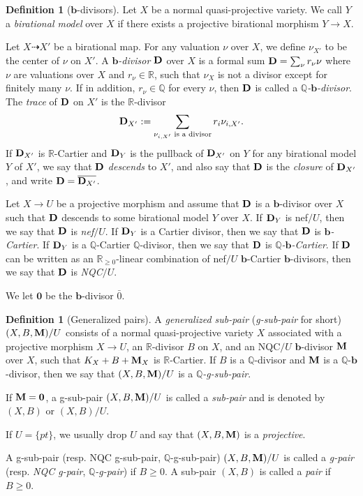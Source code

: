 \documentclass[11pt]{amsart}
\numberwithin{equation}{section}
\newcommand{\bb}{\bm{b}}
\newcommand{\Mm}{{\bf{M}}}
\newcommand{\Dd}{{\bf{D}}}
\newcommand{\Qq}{\mathbb{Q}}
\newcommand{\Rr}{\mathbb{R}}
\theoremstyle{definition}
\newtheorem{defn}[thm]{Definition}
\theoremstyle{definition}
\theoremstyle{definition}
\begin{document}
\begin{defn}[$\bb$-divisors]\label{defn: b divisors} Let $X$ be a normal quasi-projective variety. We call $Y$ a \emph{birational model} over $X$ if there exists a projective birational morphism $Y\to X$. 

Let $X\dashrightarrow X'$ be a birational map. For any valuation $\nu$ over $X$, we define $\nu_{X'}$ to be the center of $\nu$ on $X'$. A \emph{$\bb$-divisor} $\Dd$ over $X$ is a formal sum $\Dd=\sum_{\nu} r_{\nu}\nu$ where $\nu$ are valuations over $X$ and $r_{\nu}\in\mathbb R$, such that $\nu_X$ is not a divisor except for finitely many $\nu$. If in addition, $r_{\nu}\in\Qq$ for every $\nu$, then $\Dd$ is called a \emph{$\Qq$-$\bb$-divisor}. The \emph{trace} of $\Dd$ on $X'$ is the $\Rr$-divisor
$$\Dd_{X'}:=\sum_{\nu_{i,X'}\text{ is a divisor}}r_i\nu_{i,X'}.$$
If $\Dd_{X'}$ is $\Rr$-Cartier and $\Dd_{Y}$ is the pullback of $\Dd_{X'}$ on $Y$ for any birational model $Y$ of $X'$, we say that $\Dd$ \emph{descends} to $X'$, and also say that $\Dd$ is the \emph{closure} of $\Dd_{X'}$, and write $\Dd=\overline{\Dd_{X'}}$. 

Let $X\rightarrow U$ be a projective morphism and assume that $\Dd$ is a $\bb$-divisor over $X$ such that $\Dd$ descends to some birational model $Y$ over $X$. If $\Dd_Y$ is nef$/U$, then we say that $\Dd$ is \emph{nef}$/U$. If $\Dd_Y$ is a Cartier divisor, then we say that $\Dd$ is \emph{$\bb$-Cartier}. If $\Dd_Y$ is a $\Qq$-Cartier $\Qq$-divisor, then we say that $\Dd$ is \emph{$\Qq$-$\bb$-Cartier}. If $\Dd$ can be written as an $\Rr_{\geq 0}$-linear combination of nef$/U$ $\bb$-Cartier $\bb$-divisors, then we say that $\Dd$ is \emph{NQC}$/U$.

We let $\bm{0}$ be the $\bb$-divisor $\bar{0}$.
\end{defn}

\begin{defn}[Generalized pairs]\label{defn: g-pairs}
A \emph{generalized sub-pair} (\emph{g-sub-pair} for short) $(X,B,\Mm)/U$ consists of a normal quasi-projective variety $X$ associated with a projective morphism $X\rightarrow U$, an $\Rr$-divisor $B$ on $X$, and an NQC$/U$ $\bb$-divisor $\Mm$ over $X$, such that $K_X+B+\Mm_X$ is $\Rr$-Cartier. If $B$ is a $\Qq$-divisor and $\Mm$ is a $\Qq$-$\bb$-divisor, then we say that $(X,B,\Mm)/U$ is a \emph{$\Qq$-g-sub-pair}.

If $\Mm=\bm{0}$, a g-sub-pair $(X,B,\Mm)/U$ is called a \emph{sub-pair} and is denoted by $(X,B)$ or $(X,B)/U$. 

If $U=\{pt\}$, we usually drop $U$ and say that $(X,B,\Mm)$ is a \emph{projective}.

A g-sub-pair (resp. NQC g-sub-pair, $\Qq$-g-sub-pair) $(X,B,\Mm)/U$ is called a \emph{g-pair} (resp. \emph{NQC g-pair}, \emph{$\Qq$-g-pair}) if $B\geq 0$. A sub-pair $(X,B)$ is called a \emph{pair} if $B\geq 0$.
\end{defn}
\end{document}

